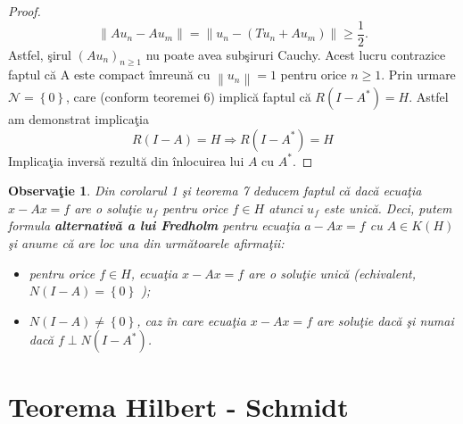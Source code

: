 \documentclass[a4paper,12pt,oneside]{report}
\newtheorem{remark}{Observa\c{t}ie}
\begin{document}
\begin{proof}
\begin{displaymath}
  \left \| Au_{n}-Au_{m} \right \| = \left \| u_{n}-\left ( Tu_{n}  + Au_{m}\right ) \right \|\geq \frac{1}{2}.
\end{displaymath}
Astfel, \c{s}irul \(\left ( Au_{n} \right )_{n\geq 1}\) nu poate avea sub\c{s}iruri Cauchy. Acest lucru contrazice faptul c\u{a} A este compact \^{i}mreun\u{a} cu \(\left \| u_{n} \right \| = 1\) pentru orice \(n\geq 1\). Prin urmare \({\mathcal{N}} = \left \{ 0 \right \}\), care (conform teoremei 6) implic\u{a} faptul c\u{a} \(R\left ( I - A^{\ast } \right ) = H\). Astfel am demonstrat implica\c{t}ia
\begin{displaymath}
  R\left ( I - A \right ) = H \Rightarrow R\left ( I - A^{\ast } \right ) = H
\end{displaymath}
Implica\c{t}ia invers\u{a} rezult\u{a} din \^{i}nlocuirea lui \(A\) cu \(A^{\ast }\).
\end{proof}
\begin{remark}
Din corolarul 1 \c{s}i teorema 7 deducem faptul c\u{a} dac\u{a} ecua\c{t}ia \(x-Ax = f\) are o solu\c{t}ie \(u_{f}\) pentru orice \(f \in H\) atunci \(u_{f}\) este unic\u{a}. Deci,  putem formula \textbf{alternativ\u{a} a lui Fredholm} pentru ecua\c{t}ia \( a - Ax = f\) cu \(A \in K\left ( H \right )\) \c{s}i anume c\u{a} are loc una din urm\u{a}toarele afirma\c{t}ii:
\begin{itemize}
   \item pentru orice \(f \in H\), ecua\c{t}ia \(x - Ax = f\) are o solu\c{t}ie unic\u{a} (echivalent, \(N\left ( I - A \right ) = \left \{ 0 \right \}\) );
   \item \(N\left ( I - A \right ) \neq  \left \{ 0 \right \}\), caz \^{i}n care ecua\c{t}ia \(x - Ax = f\) are solu\c{t}ie dac\u{a} \c{s}i numai dac\u{a} \(f\perp N\left ( I- A^{\ast } \right )\).
 \end{itemize}
\end{remark}

\section{Teorema Hilbert - Schmidt}
\end{document}

